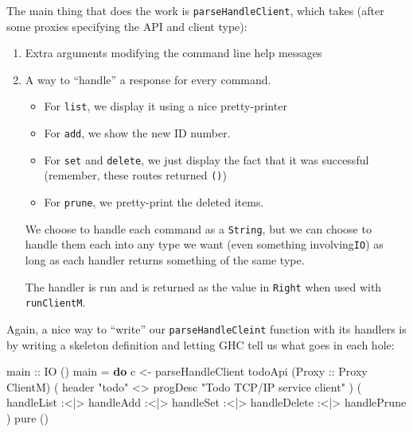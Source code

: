\documentclass[]{article}
\newenvironment{Shaded}{}{}
\newcommand{\DataTypeTok}[1]{\textcolor[rgb]{0.56,0.13,0.00}{#1}}
\newcommand{\FunctionTok}[1]{\textcolor[rgb]{0.02,0.16,0.49}{#1}}
\newcommand{\KeywordTok}[1]{\textcolor[rgb]{0.00,0.44,0.13}{\textbf{#1}}}
\newcommand{\NormalTok}[1]{#1}
\newcommand{\OperatorTok}[1]{\textcolor[rgb]{0.40,0.40,0.40}{#1}}
\newcommand{\OtherTok}[1]{\textcolor[rgb]{0.00,0.44,0.13}{#1}}
\newcommand{\StringTok}[1]{\textcolor[rgb]{0.25,0.44,0.63}{#1}}
\begin{document}
The main thing that does the work is \texttt{parseHandleClient}, which takes
(after some proxies specifying the API and client type):

\begin{enumerate}
\def\labelenumi{\arabic{enumi}.}
\item
  Extra arguments modifying the command line help messages
\item
  A way to ``handle'' a response for every command.

  \begin{itemize}
  \tightlist
  \item
    For \texttt{list}, we display it using a nice pretty-printer
  \item
    For \texttt{add}, we show the new ID number.
  \item
    For \texttt{set} and \texttt{delete}, we just display the fact that it was
    successful (remember, these routes returned \texttt{()})
  \item
    For \texttt{prune}, we pretty-print the deleted items.
  \end{itemize}

  We choose to handle each command as a \texttt{String}, but we can choose to
  handle them each into any type we want (even something involving\texttt{IO})
  as long as each handler returns something of the same type.

  The handler is run and is returned as the value in \texttt{Right} when used
  with \texttt{runClientM}.
\end{enumerate}

Again, a nice way to ``write'' our \texttt{parseHandleCleint} function with its
handlers is by writing a skeleton definition and letting GHC tell us what goes
in each hole:

\begin{Shaded}
\begin{Highlighting}[]
\OtherTok{main ::} \DataTypeTok{IO}\NormalTok{ ()}
\NormalTok{main }\OtherTok{=} \KeywordTok{do}
\NormalTok{    c }\OtherTok{<{-}}\NormalTok{ parseHandleClient todoApi (}\DataTypeTok{Proxy}\OtherTok{ ::} \DataTypeTok{Proxy} \DataTypeTok{ClientM}\NormalTok{)}
\NormalTok{        ( header }\StringTok{"todo"} \OperatorTok{<>}\NormalTok{ progDesc }\StringTok{"Todo TCP/IP service client"}\NormalTok{ )}
\NormalTok{        ( handleList}
     \OperatorTok{:<|>}\NormalTok{ handleAdd}
     \OperatorTok{:<|>}\NormalTok{ handleSet}
     \OperatorTok{:<|>}\NormalTok{ handleDelete}
     \OperatorTok{:<|>}\NormalTok{ handlePrune}
\NormalTok{        )}
    \FunctionTok{pure}\NormalTok{ ()}
\end{Highlighting}
\end{Shaded}
\end{document}
